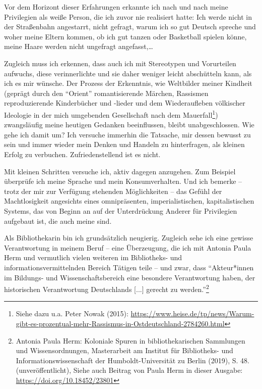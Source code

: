 \documentclass[a4paper,
fontsize=11pt,
oneside,
numbers=noperiodatend,
parskip=half-,
bibliography=totoc,
final
]{scrartcl}
\begin{document}
Vor dem Horizont dieser Erfahrungen erkannte ich nach und nach meine
Privilegien als weiße Person, die ich zuvor nie realisiert hatte: Ich
werde nicht in der Straßenbahn angestarrt, nicht gefragt, warum ich so
gut Deutsch spreche und woher meine Eltern kommen, ob ich gut tanzen
oder Basketball spielen könne, meine Haare werden nicht ungefragt
angefasst,\ldots{}

Zugleich muss ich erkennen, dass auch ich mit Stereotypen und
Vorurteilen aufwuchs, diese verinnerlichte und sie daher weniger leicht
abschütteln kann, als ich es mir wünsche. Der Prozess der Erkenntnis,
wie Weltbilder meiner Kindheit (geprägt durch den \enquote{Orient}
romantisierende Märchen, Rassismen reproduzierende Kinderbücher und
-lieder und dem Wiederaufleben völkischer Ideologie in der mich
umgebenden Gesellschaft nach dem Mauerfall\footnote{Siehe dazu u.a.
  Peter Nowak (2015):
  \url{https://www.heise.de/tp/news/Warum-gibt-es-prozentual-mehr-Rassismus-in-Ostdeutschland-2784260.html}})
zwangsläufig meine heutigen Gedanken beeinflussen, bleibt
unabgeschlossen. Wie gehe ich damit um? Ich versuche immerhin die
Tatsache, mir dessen bewusst zu sein und immer wieder mein Denken und
Handeln zu hinterfragen, als kleinen Erfolg zu verbuchen.
Zufriedenstellend ist es nicht.

Mit kleinen Schritten versuche ich, aktiv dagegen anzugehen. Zum
Beispiel überprüfe ich meine Sprache und mein Konsumverhalten. Und ich
bemerke -- trotz der mir zur Verfügung stehenden Möglichkeiten -- das
Gefühl der Machtlosigkeit angesichts eines omnipräsenten,
imperialistischen, kapitalistischen Systems, das von Beginn an auf der
Unterdrückung Anderer für Privilegien aufgebaut ist, die auch meine
sind.

Als Bibliothekarin bin ich grundsätzlich neugierig. Zugleich sehe ich
eine gewisse Verantwortung in meinem Beruf -- eine Überzeugung, die ich
mit Antonia Paula Herm und vermutlich vielen weiteren im Bibliotheks-
und informationsvermittelnden Bereich Tätigen teile -- und zwar, dass
\enquote{Akteur*innen im Bildungs- und Wissenschaftsbereich eine
besondere Verantwortung haben, der historischen Verantwortung
Deutschlands {[}...{]} gerecht zu werden.}\footnote{Antonia Paula Herm:
  Koloniale Spuren in bibliothekarischen Sammlungen und
  Wissensordnungen, Masterarbeit am Institut für Bibliotheks- und
  Informationswissenschaft der Humboldt-Universität zu Berlin (2019), S.
  48. (unveröffentlicht), Siehe auch Beitrag von Paula Herm in dieser
  Ausgabe: \url{https://doi.org/10.18452/23801}}
\end{document}
